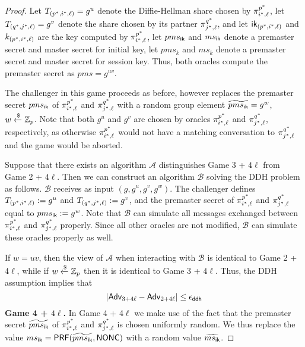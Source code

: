 \begin{proof}
 Let $T_{(p^{\ast}, i^{\ast}, \ell)} = g^u$ denote the Diffie-Hellman share chosen by $\pi^{p^{\ast}}_{i^{\ast},\ell}$, let $T_{(q^{\ast}, j^{\ast}, \ell)} = g^v$ denote the share chosen by its partner $\pi^{q^{\ast}}_{j^{\ast},\ell}$, and let $\mathsf{ik}_{(p^{\ast}, i^{\ast}, \ell)}$ and $k_{(p^{\ast}, i^{\ast}, \ell)}$ are the key computed by $\pi^{p^{\ast}}_{i^{\ast},\ell}$, let $pms_{\mathsf{ik}}$ and $ms_{\mathsf{ik}}$ denote a premaster secret and master secret for initial key, let $pms_{k}$ and $ms_{k}$ denote a premaster secret and master secret for session key. Thus, both oracles compute the premaster secret as $pms = g^{uv}$.

 The challenger in this game proceeds as before, however replaces the premaster secret $pms_{\mathsf{ik}}$ of $\pi^{p^{\ast}}_{i^{\ast},\ell}$ and $\pi^{q^{\ast}}_{j^{\ast},\ell}$ with a random group element $\widetilde{pms_{\mathsf{ik}}} = g^w$, $w \xleftarrow{\$} \mathbb{Z}_p$. Note that both $g^u$ and $g^v$ are chosen by oracles $\pi^{p^{\ast}}_{i^{\ast},\ell}$ and $\pi^{q^{\ast}}_{j^{\ast},\ell}$, respectively, as otherwise $\pi^{p^{\ast}}_{i^{\ast},\ell}$ would not have a matching conversation to $\pi^{q^{\ast}}_{j^{\ast},\ell}$ and the game would be aborted.

 Suppose that there exists an algorithm $\mathcal{A}$ distinguishes Game 3 + $4\ell$ from Game 2 + $4\ell$. Then we can construct an algorithm $\mathcal{B}$ solving the DDH problem as follows. $\mathcal{B}$ receives as input $(g,g^u,g^v,g^w)$. The challenger defines $T_{(p^{\ast}, i^{\ast}, \ell)} := g^u$ and $T_{(q^{\ast}, j^{\ast}, \ell)} := g^v$, and the premaster secret of $\pi^{p^{\ast}}_{i^{\ast},\ell}$ and $\pi^{q^{\ast}}_{j^{\ast},\ell}$ equal to $pms_{\mathsf{ik}} := g^w$. Note that $\mathcal{B}$ can simulate all messages exchanged between $\pi^{p^{\ast}}_{i^{\ast},\ell}$ and $\pi^{q^{\ast}}_{j^{\ast},\ell}$ properly. Since all other oracles are not modified, $\mathcal{B}$ can simulate these oracles properly as well.

 If $w=uv$, then the view of $\mathcal{A}$ when interacting with $\mathcal{B}$ is identical to Game 2 + $4\ell$, while if $w \xleftarrow{\$}\mathbb{Z}_p$ then it is identical to Game 3 + $4\ell$. Thus, the DDH assumption implies that
 \begin{equation}
  |\mathsf{Adv}_{3 + 4\ell} - \mathsf{Adv}_{2 + 4\ell}| \leq \epsilon_{\mathsf{ddh}}
 \end{equation}%
%
%
 \textbf{Game 4 + $4\ell$.} In Game 4 + 4$\ell$ we make use of the fact that the premaster secret $\widetilde{pms_{\mathsf{ik}}}$ of $\pi^{p^{\ast}}_{i^{\ast},\ell}$ and $\pi^{q^{\ast}}_{j^{\ast},\ell}$ is chosen uniformly random. We thus replace the value $ms_{\mathsf{ik}} = \mathsf{PRF}(\widetilde{pms_{\mathsf{ik}}}, \mathsf{NONC})$ with a random value $\widetilde{ms_{\mathsf{ik}}}$.


\end{proof}
